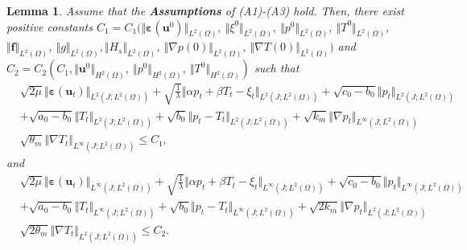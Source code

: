 \documentclass{article}
\newtheorem{lemma}{Lemma}[section]
\numberwithin{equation}{section}
\begin{document}


 \begin{lemma}\label{Th: boundness2}
Assume that the {\bf Assumptions} of (A1)-(A3) hold. Then, there exist positive constants 
 $C_1=C_1(\Vert\bm\varepsilon(\bm u^0)\Vert_{L^2(\Omega)},~\Vert\xi^0\Vert_{L^2(\Omega)},~\Vert p^0\Vert_{L^2(\Omega)},~\Vert T^0\Vert_{L^2(\Omega)}$, $\Vert \bm f\Vert_{L^2(\Omega)}$, $
\Vert g \Vert_{L^2(\Omega)},\Vert  H_{s}\Vert_{L^2(\Omega)}$, $\Vert\nabla p(0)\Vert_{L^2(\Omega)}$, $\Vert\nabla T(0)\Vert_{L^2(\Omega)})$
 and
  $C_2=C_2( C_1,\Vert\bm u^0\Vert_{H^2(\Omega)},~\Vert p^0\Vert_{H^2(\Omega)},~\Vert T^0\Vert_{H^2(\Omega)})$
 such that
  \begin{equation}\label{ut2+alpha beta C1}
\begin{aligned} 
 &\sqrt{2\mu}\Vert\bm\varepsilon(\bm u_t)\Vert_{L^2(J;L^2(\Omega))}
 +\sqrt{\frac{1}{\lambda}}\Vert\alpha p_t+\beta T_t-\xi_t\Vert_{L^2(J;L^2(\Omega))}+\sqrt{c_0-b_0}\Vert p_t\Vert_{L^2(J;L^2(\Omega))}\\
 &+\sqrt{a_0-b_0}\Vert T_t\Vert_{L^2(J;L^2(\Omega))} +\sqrt{b_0}\Vert p_t-T_t\Vert_{L^2(J;L^2(\Omega))}
 +\sqrt{k_m}\Vert \nabla p_t\Vert_{L^\infty(J;L^2(\Omega))}\\
 &\sqrt{\theta_m}\Vert \nabla T_t\Vert_{L^\infty(J;L^2(\Omega))}
 \leq C_1,
 \end{aligned}
\end{equation}
and
 \begin{equation}\label{ut2+alpha beta C2}
\begin{aligned} 
 &\sqrt{2\mu}\Vert\bm\varepsilon(\bm u_t)\Vert_{L^\infty(J;L^2(\Omega))}
 +\sqrt{\frac{1}{\lambda}}\Vert\alpha p_t+\beta T_t-\xi_t\Vert_{L^\infty(J;L^2(\Omega))}+\sqrt{c_0-b_0}\Vert p_t\Vert_{L^\infty(J;L^2(\Omega))}\\
 &+\sqrt{a_0-b_0}\Vert T_t\Vert_{L^\infty(J;L^2(\Omega))}+\sqrt{b_0}\Vert p_t-T_t\Vert_{L^\infty(J;L^2(\Omega))}
 +\sqrt{2k_m}\Vert \nabla p_t\Vert_{L^2(J;L^2(\Omega))}\\
 &\sqrt{2\theta_m}\Vert \nabla T_t\Vert_{L^2(J;L^2(\Omega))} \leq C_2.
 \end{aligned}
\end{equation}
\end{lemma}
\end{document}
